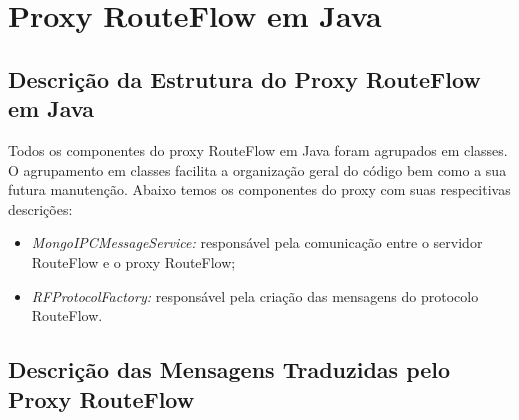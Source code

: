 \chapter{Proxy RouteFlow em Java}

\section{Descrição da Estrutura do Proxy RouteFlow em Java}

Todos os componentes do proxy RouteFlow em Java foram agrupados em classes. O agrupamento em classes facilita a 
organização geral do código bem como a sua futura manutenção. Abaixo temos os componentes do proxy com suas respecitivas
descrições:

\begin{itemize}
\item \textit{MongoIPCMessageService:} responsável pela comunicação entre o servidor RouteFlow e o proxy RouteFlow;
\item \textit{RFProtocolFactory:} responsável pela criação das mensagens do protocolo RouteFlow.
\end{itemize} 

\section{Descrição das Mensagens Traduzidas pelo Proxy RouteFlow}

